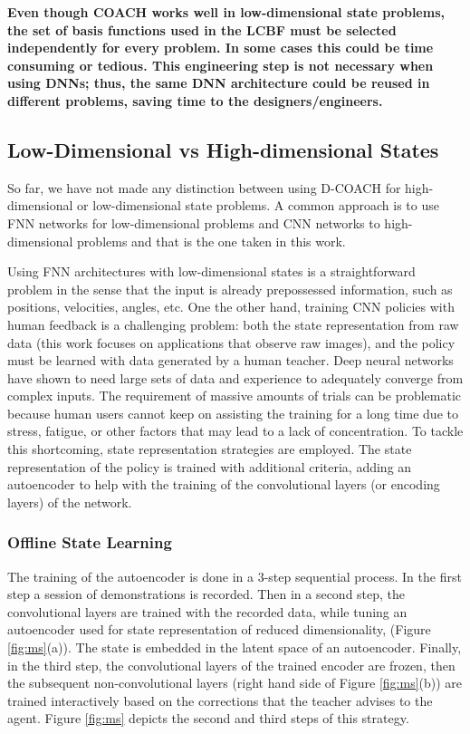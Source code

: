 \textbf{Even though COACH works well in low-dimensional state problems, the set of basis functions used in the LCBF must be selected independently for every problem. In some cases this could be time consuming or tedious. This engineering step is not necessary when using DNNs; thus, the same DNN architecture could be reused in different problems, saving time to the designers/engineers.}


\subsection{Low-Dimensional vs High-dimensional States}
So far, we have not made any distinction between using D-COACH for high-dimensional or low-dimensional state problems. A common approach is to use FNN networks for low-dimensional problems and CNN networks to high-dimensional problems and that is the one taken in this work. 

Using FNN architectures with low-dimensional states is a straightforward problem in the sense that the input is already prepossessed information, such as positions, velocities, angles, etc. One the other hand, training CNN policies with human feedback is a challenging problem: both the state representation from raw data (this work focuses on applications that observe raw images), and the policy must be learned with data generated by a human teacher. Deep neural networks have shown to need large sets of data and experience to adequately converge from complex inputs. The requirement of massive amounts of trials can be problematic because human users cannot keep on assisting the training for a long time due to stress, fatigue, or other factors that may lead to a lack of concentration. To tackle this shortcoming, state representation strategies are employed. The state representation of the policy is trained with additional criteria, adding an autoencoder to help with the training of the convolutional layers (or encoding layers) of the network. 

\subsubsection{Offline State Learning}
The training of the autoencoder is done in a 3-step sequential process. In the first step a session of demonstrations is recorded. Then in a second step, the convolutional layers are trained  with the recorded data, while tuning an  autoencoder  used  for state representation of reduced dimensionality, (Figure \ref{fig:ms}(a)). The state is embedded in the latent space of an autoencoder. Finally, in the third step, the convolutional layers of the trained encoder are frozen, then the subsequent non-convolutional layers (right hand side of Figure \ref{fig:ms}(b)) are trained interactively based on the corrections that the teacher advises to the agent. Figure \ref{fig:ms} depicts the second and third steps of this strategy. 

